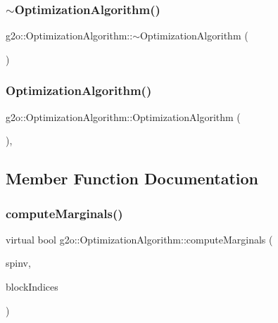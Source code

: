 \subsubsection{\texorpdfstring{$\sim$\+Optimization\+Algorithm()}{~OptimizationAlgorithm()}}
{\footnotesize\ttfamily g2o\+::\+Optimization\+Algorithm\+::$\sim$\+Optimization\+Algorithm (\begin{DoxyParamCaption}{ }\end{DoxyParamCaption})\hspace{0.3cm}{\ttfamily [virtual]}}

\mbox{\label{classg2o_1_1_optimization_algorithm_af4bf8ed80e63df3f1a066e8b0098eb27}} 
\subsubsection{\texorpdfstring{Optimization\+Algorithm()}{OptimizationAlgorithm()}\hspace{0.1cm}{\footnotesize\ttfamily [2/2]}}
{\footnotesize\ttfamily g2o\+::\+Optimization\+Algorithm\+::\+Optimization\+Algorithm (\begin{DoxyParamCaption}\item[{const \mbox{\hyperlink{classg2o_1_1_optimization_algorithm}{Optimization\+Algorithm}} \&}]{ }\end{DoxyParamCaption})\hspace{0.3cm}{\ttfamily [inline]}, {\ttfamily [private]}}



\subsection{Member Function Documentation}
\mbox{\label{classg2o_1_1_optimization_algorithm_a67b159f3a83471ba9ebcc0a9162a0e23}} 
\subsubsection{\texorpdfstring{compute\+Marginals()}{computeMarginals()}}
{\footnotesize\ttfamily virtual bool g2o\+::\+Optimization\+Algorithm\+::compute\+Marginals (\begin{DoxyParamCaption}\item[{\mbox{\hyperlink{classg2o_1_1_sparse_block_matrix}{Sparse\+Block\+Matrix}}$<$ Matrix\+Xd $>$ \&}]{spinv,  }\item[{const std\+::vector$<$ std\+::pair$<$ int, int $>$ $>$ \&}]{block\+Indices }\end{DoxyParamCaption})\hspace{0.3cm}{\ttfamily [pure virtual]}}

